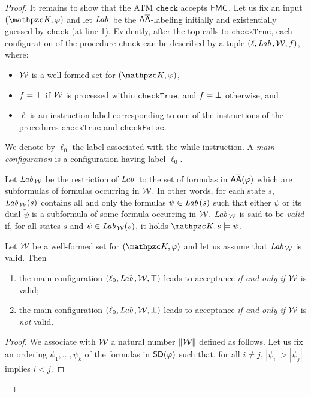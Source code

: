\begin{proof}
It remains to show that the ATM $\texttt{check}$ accepts $\mathsf{FMC}$.  Let us fix an input $(\Ku,\varphi)$ and let $\textit{Lab}\,$ be the  $\mathsf{A\overline{A}}$-labeling initially and existentially guessed by
$\texttt{check}$ (at line 1).
 Evidently, after the top  calls  to $\texttt{checkTrue}$,  each configuration of the procedure $\texttt{check}$  can be described by a tuple $(\ell,\textit{Lab}\,, {\mathcal{W}}, f)$, where: 
 \begin{itemize}
     \item ${\mathcal{W}}$ is a well-formed set for $(\Ku,\varphi)$,
     \item $f=\operatorname{\top}$ if ${\mathcal{W}}$ is processed within $\texttt{checkTrue}$, and $f=\operatorname{\bot}$ otherwise, and
     \item $\ell$ is an instruction label corresponding to one of the instructions of the procedures $\texttt{checkTrue}$ and $\texttt{checkFalse}$.
 \end{itemize}
We denote by $\ell_0$ the label associated with the while instruction. A \emph{main configuration} is a configuration having label $\ell_0$. 

Let $\textit{Lab}\,_{\mathcal{W}}$ be the restriction of $\textit{Lab}\,$
to the set of formulas in $\mathsf{A\overline{A}}(\varphi)$ which are subformulas of formulas occurring in ${\mathcal{W}}$. In other words, for each state $s$,
$\textit{Lab}\,_{\mathcal{W}}(s)$ contains all and only the formulas $\psi\in \textit{Lab}\,(s)$ such that either $\psi$ or its dual $\widetilde{\psi}$
is a subformula of some formula occurring in ${\mathcal{W}}$. $\textit{Lab}\,_{\mathcal{W}}$ is said to be \emph{valid} if, for all states $s$ and $\psi\in \textit{Lab}\,_{\mathcal{W}}(s)$, it holds $\Ku,s\models \psi$.

\newcommand{\Norm}[1]{\ensuremath{\|{#1}\|}}

\begin{claim}\label{claim:mainconf}
Let ${\mathcal{W}}$ be a  well-formed set  for $(\Ku,\varphi)$ and let us assume that $\textit{Lab}\,_{\mathcal{W}}$ is valid. Then
\begin{enumerate}
  \item the main configuration $(\ell_0,\textit{Lab}\,, {\mathcal{W}},\operatorname{\top})$ leads to acceptance \emph{if and only if} ${\mathcal{W}}$ is valid;
  \item the main configuration $(\ell_0,\textit{Lab}\,, {\mathcal{W}},\operatorname{\bot})$ leads to acceptance \emph{if and only if} ${\mathcal{W}}$ is \emph{not} valid.
\end{enumerate}
\end{claim} 
\begin{proof}
 We associate with ${\mathcal{W}}$  a natural number $\Norm{\WS}$ defined as follows. Let us fix an ordering $\psi_1,\ldots,\psi_k$ of the formulas in $\textsf{SD}(\varphi)$  such that, for all $i\neq j$,  $|\psi_i|>|\psi_j|$ implies $i<j$. 
 

\end{proof}
\end{proof}
